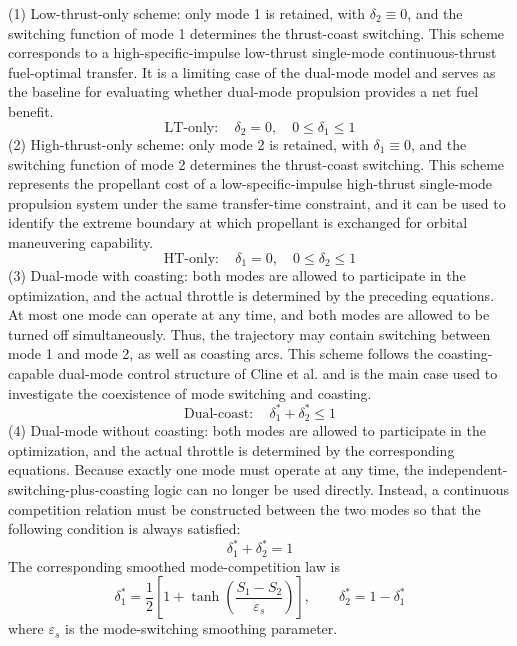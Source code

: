 \documentclass{IEEEtaes}
\begin{document}
(1) Low-thrust-only scheme: only mode 1 is retained, with $\delta_2\equiv0$, and the switching function of mode 1 determines the thrust-coast switching. This scheme corresponds to a high-specific-impulse low-thrust single-mode continuous-thrust fuel-optimal transfer. It is a limiting case of the dual-mode model and serves as the baseline for evaluating whether dual-mode propulsion provides a net fuel benefit.
\begin{equation}
\text{LT-only}:\quad \delta_2=0,\quad 0\leq\delta_1\leq1
\end{equation}
(2) High-thrust-only scheme: only mode 2 is retained, with $\delta_1\equiv0$, and the switching function of mode 2 determines the thrust-coast switching. This scheme represents the propellant cost of a low-specific-impulse high-thrust single-mode propulsion system under the same transfer-time constraint, and it can be used to identify the extreme boundary at which propellant is exchanged for orbital maneuvering capability.
\begin{equation}
\text{HT-only}:\quad \delta_1=0,\quad 0\leq\delta_2\leq1
\end{equation}
(3) Dual-mode with coasting: both modes are allowed to participate in the optimization, and the actual throttle is determined by the preceding equations. At most one mode can operate at any time, and both modes are allowed to be turned off simultaneously. Thus, the trajectory may contain switching between mode 1 and mode 2, as well as coasting arcs. This scheme follows the coasting-capable dual-mode control structure of Cline et al. \cite{cline2024a} and is the main case used to investigate the coexistence of mode switching and coasting.
\begin{equation}
\text{Dual-coast}:\quad \delta_1^{*}+\delta_2^{*}\leq1
\end{equation}
(4) Dual-mode without coasting: both modes are allowed to participate in the optimization, and the actual throttle is determined by the corresponding equations. Because exactly one mode must operate at any time, the independent-switching-plus-coasting logic can no longer be used directly. Instead, a continuous competition relation must be constructed between the two modes so that the following condition is always satisfied:
\begin{equation}
\delta_1^{*}+\delta_2^{*}=1
\end{equation}
The corresponding smoothed mode-competition law is
\begin{equation}
\delta_1^{*}=\frac{1}{2}\left[1+\tanh\left(\frac{S_1-S_2}{\varepsilon_s}\right)\right],\qquad \delta_2^{*}=1-\delta_1^{*}
\end{equation}
where $\varepsilon_s$ is the mode-switching smoothing parameter.
\end{document}
